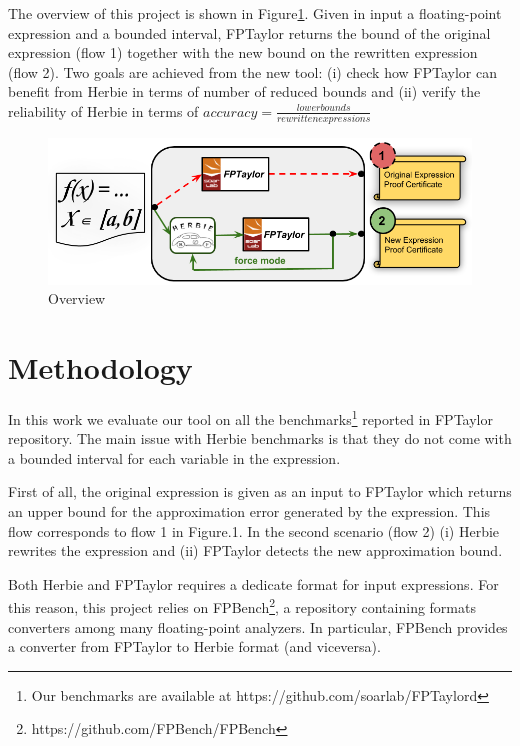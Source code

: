 \documentclass[runningheads]{llncs}
\begin{document}
The overview of this project is shown in Figure\ref{fig:architecture}. Given in input a floating-point expression and a bounded interval, FPTaylor returns the bound of the original expression (flow 1) together with the new bound on the rewritten expression (flow 2). 
Two goals are achieved from the new tool: (i) check how FPTaylor can benefit from Herbie in terms of number of reduced bounds and (ii) verify the reliability of Herbie in terms of $accuracy= \frac{lower bounds}{rewritten expressions}$
\begin{figure}[t]
	\begin{center}
		\includegraphics[width=\columnwidth]{picture}
	\end{center}
	\caption{Overview}\label{fig:architecture}
\end{figure}

\section{Methodology}
In this work we evaluate our tool on all the benchmarks\footnote{Our benchmarks are available at https://github.com/soarlab/FPTaylord} reported in FPTaylor~\cite{fptaylor} repository. The main issue with Herbie benchmarks is that they do not come with a bounded interval for each variable in the expression.

First of all, the original expression is given as an input to FPTaylor which returns an upper bound for the approximation error generated by the expression. This flow corresponds to flow 1 in Figure.1.
In the second scenario (flow 2) (i) Herbie rewrites the expression and (ii) FPTaylor detects the new approximation bound.

Both Herbie and FPTaylor requires a dedicate format for input expressions. For this reason, this project relies on FPBench\footnote{https://github.com/FPBench/FPBench}, a repository containing formats converters among many floating-point analyzers. 
In particular, FPBench provides a converter from FPTaylor to Herbie format (and viceversa).
\end{document}
